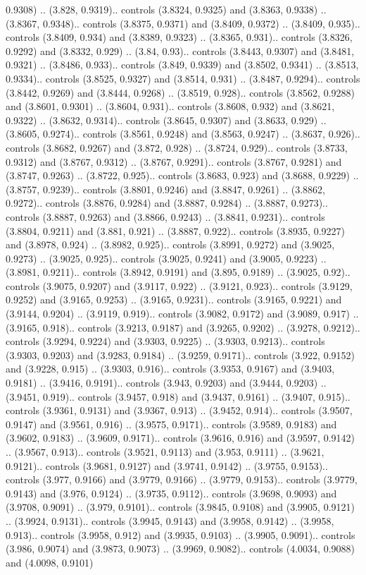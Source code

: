 0.9308) .. (3.828, 0.9319).. controls (3.8324, 0.9325) and (3.8363, 0.9338) .. (3.8367, 0.9348).. controls (3.8375, 0.9371) and (3.8409, 0.9372) .. (3.8409, 0.935).. controls (3.8409, 0.934) and (3.8389, 0.9323) .. (3.8365, 0.931).. controls (3.8326, 0.9292) and (3.8332, 0.929) .. (3.84, 0.93).. controls (3.8443, 0.9307) and (3.8481, 0.9321) .. (3.8486, 0.933).. controls (3.849, 0.9339) and (3.8502, 0.9341) .. (3.8513, 0.9334).. controls (3.8525, 0.9327) and (3.8514, 0.931) .. (3.8487, 0.9294).. controls (3.8442, 0.9269) and (3.8444, 0.9268) .. (3.8519, 0.928).. controls (3.8562, 0.9288) and (3.8601, 0.9301) .. (3.8604, 0.931).. controls (3.8608, 0.932) and (3.8621, 0.9322) .. (3.8632, 0.9314).. controls (3.8645, 0.9307) and (3.8633, 0.929) .. (3.8605, 0.9274).. controls (3.8561, 0.9248) and (3.8563, 0.9247) .. (3.8637, 0.926).. controls (3.8682, 0.9267) and (3.872, 0.928) .. (3.8724, 0.929).. controls (3.8733, 0.9312) and (3.8767, 0.9312) .. (3.8767, 0.9291).. controls (3.8767, 0.9281) and (3.8747, 0.9263) .. (3.8722, 0.925).. controls (3.8683, 0.923) and (3.8688, 0.9229) .. (3.8757, 0.9239).. controls (3.8801, 0.9246) and (3.8847, 0.9261) .. (3.8862, 0.9272).. controls (3.8876, 0.9284) and (3.8887, 0.9284) .. (3.8887, 0.9273).. controls (3.8887, 0.9263) and (3.8866, 0.9243) .. (3.8841, 0.9231).. controls (3.8804, 0.9211) and (3.881, 0.921) .. (3.8887, 0.922).. controls (3.8935, 0.9227) and (3.8978, 0.924) .. (3.8982, 0.925).. controls (3.8991, 0.9272) and (3.9025, 0.9273) .. (3.9025, 0.925).. controls (3.9025, 0.9241) and (3.9005, 0.9223) .. (3.8981, 0.9211).. controls (3.8942, 0.9191) and (3.895, 0.9189) .. (3.9025, 0.92).. controls (3.9075, 0.9207) and (3.9117, 0.922) .. (3.9121, 0.923).. controls (3.9129, 0.9252) and (3.9165, 0.9253) .. (3.9165, 0.9231).. controls (3.9165, 0.9221) and (3.9144, 0.9204) .. (3.9119, 0.919).. controls (3.9082, 0.9172) and (3.9089, 0.917) .. (3.9165, 0.918).. controls (3.9213, 0.9187) and (3.9265, 0.9202) .. (3.9278, 0.9212).. controls (3.9294, 0.9224) and (3.9303, 0.9225) .. (3.9303, 0.9213).. controls (3.9303, 0.9203) and (3.9283, 0.9184) .. (3.9259, 0.9171).. controls (3.922, 0.9152) and (3.9228, 0.915) .. (3.9303, 0.916).. controls (3.9353, 0.9167) and (3.9403, 0.9181) .. (3.9416, 0.9191).. controls (3.943, 0.9203) and (3.9444, 0.9203) .. (3.9451, 0.919).. controls (3.9457, 0.918) and (3.9437, 0.9161) .. (3.9407, 0.915).. controls (3.9361, 0.9131) and (3.9367, 0.913) .. (3.9452, 0.914).. controls (3.9507, 0.9147) and (3.9561, 0.916) .. (3.9575, 0.9171).. controls (3.9589, 0.9183) and (3.9602, 0.9183) .. (3.9609, 0.9171).. controls (3.9616, 0.916) and (3.9597, 0.9142) .. (3.9567, 0.913).. controls (3.9521, 0.9113) and (3.953, 0.9111) .. (3.9621, 0.9121).. controls (3.9681, 0.9127) and (3.9741, 0.9142) .. (3.9755, 0.9153).. controls (3.977, 0.9166) and (3.9779, 0.9166) .. (3.9779, 0.9153).. controls (3.9779, 0.9143) and (3.976, 0.9124) .. (3.9735, 0.9112).. controls (3.9698, 0.9093) and (3.9708, 0.9091) .. (3.979, 0.9101).. controls (3.9845, 0.9108) and (3.9905, 0.9121) .. (3.9924, 0.9131).. controls (3.9945, 0.9143) and (3.9958, 0.9142) .. (3.9958, 0.913).. controls (3.9958, 0.912) and (3.9935, 0.9103) .. (3.9905, 0.9091).. controls (3.986, 0.9074) and (3.9873, 0.9073) .. (3.9969, 0.9082).. controls (4.0034, 0.9088) and (4.0098, 0.9101) 
